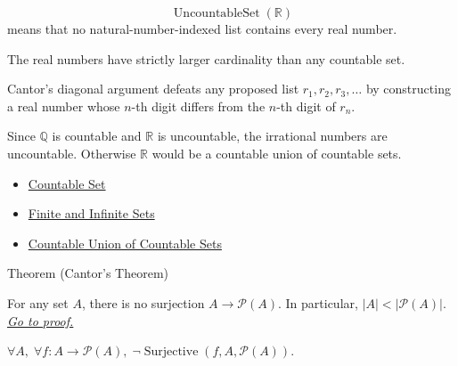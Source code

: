 \begin{remark*}
\[
  \operatorname{UncountableSet}(\mathbb{R})
\] means that no natural-number-indexed
list contains every real number.
\end{remark*}

\begin{remark*}[Interpretation]
The real numbers have strictly larger cardinality than any countable set.
\end{remark*}

\begin{remark*}[Exposition]
Cantor's diagonal argument defeats any proposed list
$r_1,r_2,r_3,\dots$ by constructing a real number whose $n$-th digit differs
from the $n$-th digit of $r_n$.
\end{remark*}

\begin{remark*}[Exposition]
Since $\mathbb{Q}$ is countable and $\mathbb{R}$ is uncountable, the
irrational numbers are uncountable. Otherwise $\mathbb{R}$ would be a
countable union of countable sets.
\end{remark*}

\begin{dependencies}
\begin{itemize}
  \item \hyperref[def:countable]{Countable Set}
  \item \hyperref[def:finite-infinite]{Finite and Infinite Sets}
  \item \hyperref[thm:countable-union]{Countable Union of Countable Sets}
\end{itemize}
\end{dependencies}


\begin{theorembox}{Theorem (Cantor's Theorem)}
\begin{theorem}\label{thm:cantor}
For any set $A$, there is no surjection $A\to\mathcal{P}(A)$. In particular,
$|A|<|\mathcal{P}(A)|$.
\hyperref[prf:cantor]{\textit{Go to proof.}}
\end{theorem}
\end{theorembox}

\begin{remark*}
$\forall A,\;\forall f:A\to\mathcal{P}(A),\;
\neg\operatorname{Surjective}(f,A,\mathcal{P}(A))$.
\end{remark*}

